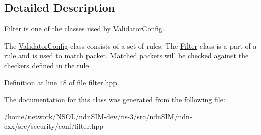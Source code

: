 \subsection{Detailed Description}
\hyperlink{classndn_1_1security_1_1conf_1_1Filter}{Filter} is one of the classes used by \hyperlink{classndn_1_1ValidatorConfig}{Validator\+Config}. 

The \hyperlink{classndn_1_1ValidatorConfig}{Validator\+Config} class consists of a set of rules. The \hyperlink{classndn_1_1security_1_1conf_1_1Filter}{Filter} class is a part of a rule and is used to match packet. Matched packets will be checked against the checkers defined in the rule. 

Definition at line 48 of file filter.\+hpp.



The documentation for this class was generated from the following file\+:\begin{DoxyCompactItemize}
\item 
/home/network/\+N\+S\+O\+L/ndn\+S\+I\+M-\/dev/ns-\/3/src/ndn\+S\+I\+M/ndn-\/cxx/src/security/conf/filter.\+hpp\end{DoxyCompactItemize}
